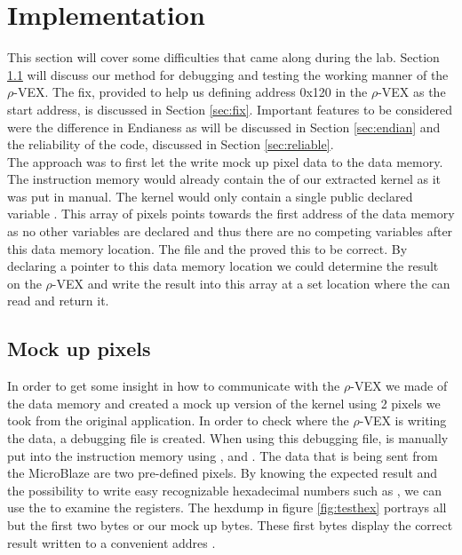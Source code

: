 \section{Implementation}
This section will cover some difficulties that came along during the lab. Section \ref{sec:debugging} will discuss our method for debugging and testing the working manner of the $\rho$-VEX. The fix, provided to help us defining address 0x120 in the $\rho$-VEX as the start address, is discussed in Section \ref{sec:fix}. Important features to be considered were the difference in Endianess as will be discussed in Section \ref{sec:endian} and the reliability of the code, discussed in Section \ref{sec:reliable}.\\

The approach was to first let the  write mock up pixel data to the data memory. The instruction memory would already contain the  of our extracted kernel as it was put in manual. The kernel would only contain a single public declared variable . This array of pixels points towards the first address of the data memory as no other variables are declared and thus there are no competing variables after this data memory location. The  file and the  proved this to be correct. By declaring a pointer to this data memory location we could determine the result on the $\rho$-VEX and write the result into this array at a set location where the  can read and return it. 

\subsection{Mock up pixels}
\label{sec:debugging}
In order to get some insight in how to communicate with the $\rho$-VEX we made  of the data memory and created a mock up version of the kernel using 2 pixels we took from the original application. In order to check where the $\rho$-VEX is writing the data, a debugging file  is created. When using this debugging file,  is manually put into the instruction memory using ,  and . The data that is being sent from the MicroBlaze are two pre-defined pixels. By knowing the expected result and the possibility to write easy recognizable hexadecimal numbers such as , we can use the  to examine the registers. The  hexdump in figure \ref{fig:testhex} portrays all but the first two bytes or our mock up bytes. These first bytes display the correct result written to a convenient addres .

